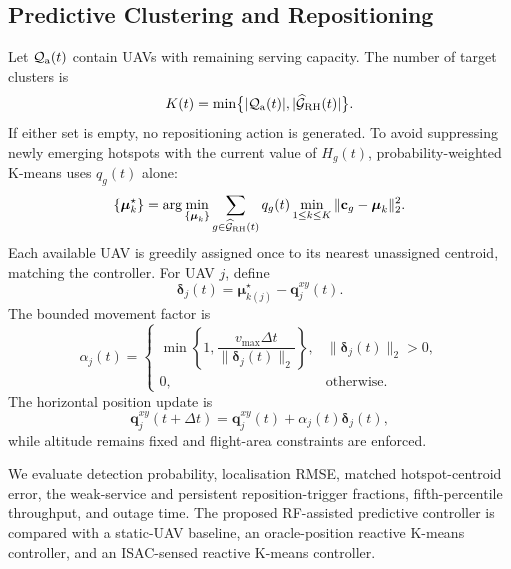 \subsection{Predictive Clustering and Repositioning}

Let $\mathcal{Q}_{\rm a}(t)$ contain UAVs with remaining serving
capacity. The number of target clusters is
\begin{equation}
 K(t)=\min\bigl\{|\mathcal{Q}_{\rm a}(t)|,
 |\widehat{\mathcal{G}}_{\rm RH}(t)|\bigr\}.
 \label{eq:k-selection}
\end{equation}
If either set is empty, no repositioning action is generated. To
avoid suppressing newly emerging hotspots with the current value of
$H_g(t)$, probability-weighted K-means uses $q_g(t)$ alone:
\begin{equation}
 \{\boldsymbol{\mu}_k^\star\}=
 \arg\min_{\{\boldsymbol{\mu}_k\}}
 \sum_{g\in\widehat{\mathcal{G}}_{\rm RH}(t)}q_g(t)
 \min_{1\leq k\leq K}
 \|\mathbf{c}_g-\boldsymbol{\mu}_k\|_2^2.
 \label{eq:kmeans-compact}
\end{equation}
Each available UAV is greedily assigned once to its nearest
unassigned centroid, matching the controller. For UAV $j$, define
\begin{equation}
 \boldsymbol{\delta}_j(t)=
 \boldsymbol{\mu}_{k(j)}^\star-\mathbf{q}^{xy}_j(t).
\end{equation}
The bounded movement factor is
\begin{equation}
 \alpha_j(t)=
 \begin{cases}
 \displaystyle\min\!\left\{1,
 \dfrac{v_{\max}\Delta t}{\|\boldsymbol{\delta}_j(t)\|_2}\right\},
 &\|\boldsymbol{\delta}_j(t)\|_2>0,\\[1mm]
 0,&\text{otherwise}.
 \end{cases}
 \label{eq:movement-step}
\end{equation}
The horizontal position update is
\begin{equation}
 \mathbf{q}^{xy}_j(t+\Delta t)=
 \mathbf{q}^{xy}_j(t)+
 \alpha_j(t)\boldsymbol{\delta}_j(t),
 \label{eq:movement-compact}
\end{equation}
while altitude remains fixed and flight-area constraints are
enforced.

We evaluate detection probability, localisation RMSE, matched
hotspot-centroid error, the weak-service and persistent
reposition-trigger fractions, fifth-percentile throughput, and outage
time. The proposed RF-assisted predictive controller is compared
with a static-UAV baseline, an oracle-position reactive K-means
controller, and an ISAC-sensed reactive K-means controller.
